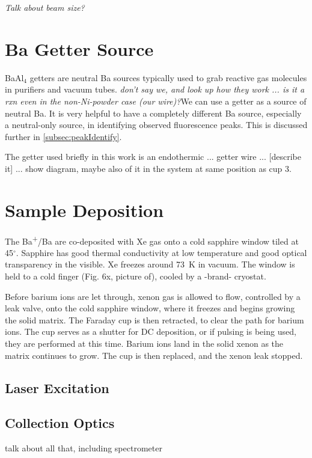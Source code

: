 {\color{gray}\emph{Talk about beam size?}}

\section{Ba Getter Source}

BaAl$_{4}$ getters are neutral Ba sources typically used to grab reactive gas molecules in purifiers and vacuum tubes.  \emph{\color{red}don't say we, and look up how they work ... is it a rxn even in the non-Ni-powder case (our wire)?}We can use a getter as a source of neutral Ba.  It is very helpful to have a completely different Ba source, especially a neutral-only source, in identifying observed fluorescence peaks.  This is discussed further in \ref{subsec:peakIdentify}.

The getter used briefly in this work is an endothermic ... getter wire ... {\color{gray}[describe it]} ... show diagram, maybe also of it in the system at same position as cup 3.

\section{Sample Deposition}

The Ba\textsuperscript{+}/Ba are co-deposited with Xe gas onto a cold sapphire window tiled at 45$^{\circ}$.  Sapphire has good thermal conductivity at low temperature and good optical transparency in the visible.  Xe freezes around {\color{red}73~K} in vacuum.  The window is held to a cold finger (Fig. 6x, picture of), cooled by a -brand- cryostat. %

Before barium ions are let through, xenon gas is allowed to flow, controlled by a leak valve, onto the cold sapphire window, where it freezes and begins growing the solid matrix.  The Faraday cup is then retracted, to clear the path for barium ions.  The cup serves as a shutter for DC deposition, or if pulsing is being used, they are performed at this time.  Barium ions land in the solid xenon as the matrix continues to grow.  The cup is then replaced, and the xenon leak stopped.

\subsection{Laser Excitation}

\subsection{Collection Optics}

talk about all that, including spectrometer